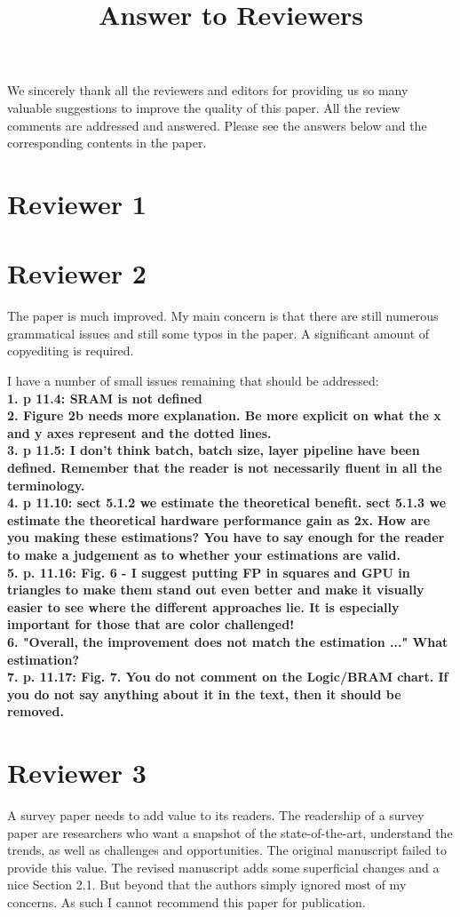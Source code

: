 \documentclass[12pt]{paper}
\title{Answer to Reviewers}
\newcommand{\reviewer}[1]{\section*{Reviewer #1}}
\newcommand{\comment}[1]{\noindent\textbf{#1}\\}
\begin{document}
\maketitle

We sincerely thank all the reviewers and editors for providing us so many valuable suggestions to improve the quality of this paper. All the review comments are addressed and answered. Please see the answers below and the corresponding contents in the paper.

\reviewer{1}



\reviewer{2}

The paper is much improved. My main concern is that there are still numerous grammatical issues and still some typos in the paper. A significant amount of copyediting is required.

I have a number of small issues remaining that should be addressed:\\


\comment{1. p 11.4: SRAM is not defined}

\comment{2. Figure 2b needs more explanation. Be more explicit on what the x and y axes represent and the dotted lines.}

\comment{3. p 11.5: I don't think batch, batch size, layer pipeline have been defined. Remember that the reader is not necessarily fluent in all the terminology.}

\comment{4. p 11.10: sect 5.1.2 we estimate the theoretical benefit. sect 5.1.3 we estimate the theoretical hardware performance gain as 2x. How are you making these estimations? You have to say enough for the reader to make a judgement as to whether your estimations are valid.}

\comment{5. p. 11.16:  Fig. 6 - I suggest putting FP in squares and GPU in triangles to make them stand out even better and make it visually easier to see where the different approaches lie. It is especially important for those that are color challenged!}

\comment{6. "Overall, the improvement does not match the estimation ..."  What estimation?}

\comment{7. p. 11.17:  Fig. 7. You do not comment on the Logic/BRAM chart. If you do not say anything about it in the text, then it should be removed.}

\reviewer{3}

A survey paper needs to add value to its readers. The readership of a survey paper are researchers who want a snapshot of the state-of-the-art, understand the trends, as well as challenges and opportunities. The original manuscript failed to provide this value. The revised manuscript adds some superficial changes and a nice Section 2.1. But beyond that the authors simply ignored most of my concerns. As such I cannot recommend this paper for publication.
\end{document}
